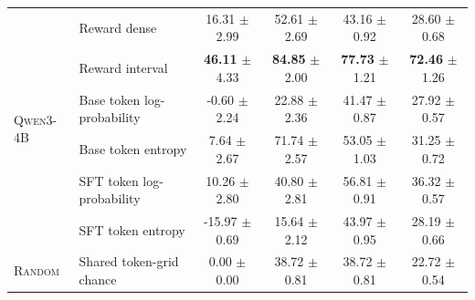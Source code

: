 \begin{table}[t]
\begin{tabular}{llcccc}
\midrule
\multirow{6}{*}{\textsc{Qwen3-4B}} & Reward dense & 16.31 $\pm$ 2.99 & 52.61 $\pm$ 2.69 & 43.16 $\pm$ 0.92 & 28.60 $\pm$ 0.68 \\
 & Reward interval & \textbf{46.11} $\pm$ 4.33 & \textbf{84.85} $\pm$ 2.00 & \textbf{77.73} $\pm$ 1.21 & \textbf{72.46} $\pm$ 1.26 \\
 & Base token log-probability & -0.60 $\pm$ 2.24 & 22.88 $\pm$ 2.36 & 41.47 $\pm$ 0.87 & 27.92 $\pm$ 0.57 \\
 & Base token entropy & 7.64 $\pm$ 2.67 & 71.74 $\pm$ 2.57 & 53.05 $\pm$ 1.03 & 31.25 $\pm$ 0.72 \\
 & SFT token log-probability & 10.26 $\pm$ 2.80 & 40.80 $\pm$ 2.81 & 56.81 $\pm$ 0.91 & 36.32 $\pm$ 0.57 \\
 & SFT token entropy & -15.97 $\pm$ 0.69 & 15.64 $\pm$ 2.12 & 43.97 $\pm$ 0.95 & 28.19 $\pm$ 0.66 \\
\midrule
\textsc{Random} & Shared token-grid chance & 0.00 $\pm$ 0.00 & 38.72 $\pm$ 0.81 & 38.72 $\pm$ 0.81 & 22.72 $\pm$ 0.54 \\
\bottomrule
\end{tabular}
\end{table}
